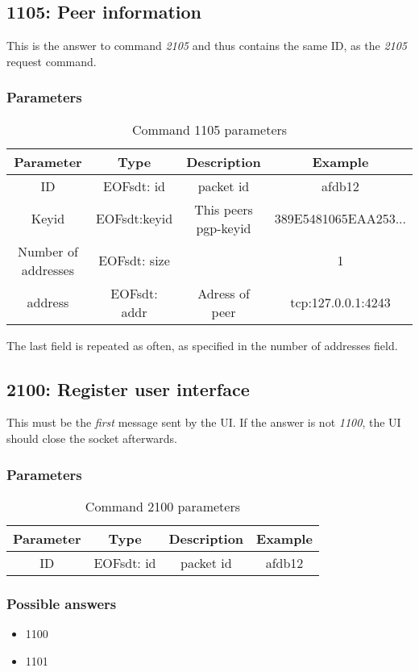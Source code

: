 \documentclass[12pt,a4paper]{book}
\begin{document}
\subsection{1105: Peer information}
This is the answer to command \emph{2105} and thus contains the
same ID, as the \emph{2105} request command.
\subsubsection{Parameters}
\begin{longtable}{|c|c|c|c|}
\caption{Command 1105 parameters}\\
\hline
\textbf{Parameter} & \textbf{Type} & \textbf{Description} & \textbf{Example}\\
\hline
ID & EOFsdt: id & packet id & afdb12\\
\hline
Keyid & EOFsdt:keyid & This peers pgp-keyid & 389E5481065EAA253...\\
\hline
Number of addresses & EOFsdt: size & & 1\\
\hline
address & EOFsdt: addr & Adress of peer & tcp:127.0.0.1:4243\\
\hline
\end{longtable}
The last field is repeated as often, as specified in the number of addresses
field.
\subsection{2100: Register user interface}
This must be the \emph{first} message sent by the UI. If the answer is not
\emph{1100}, the UI should close the socket afterwards.

\subsubsection{Parameters}
\begin{longtable}{|c|c|c|c|}
\caption{Command 2100 parameters}\\
\hline
\textbf{Parameter} & \textbf{Type} & \textbf{Description} & \textbf{Example}\\
\hline
ID & EOFsdt: id & packet id & afdb12\\
\hline
\end{longtable}

\subsubsection{Possible answers}
\begin{itemize}
\item 1100
\item 1101
\end{itemize}
\end{document}
